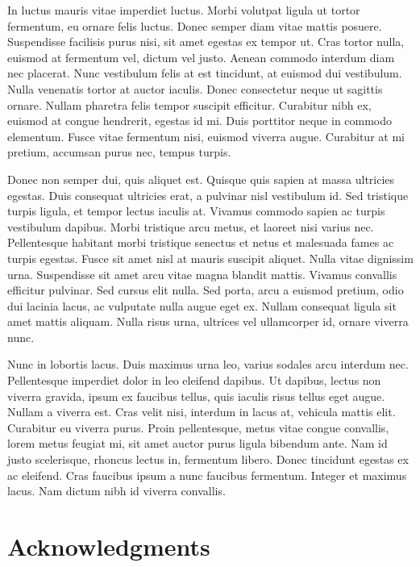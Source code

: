 \documentclass[
]{agujournal2019}
\begin{document}
In luctus mauris vitae imperdiet luctus. Morbi volutpat ligula ut tortor
fermentum, eu ornare felis luctus. Donec semper diam vitae mattis
posuere. Suspendisse facilisis purus nisi, sit amet egestas ex tempor
ut. Cras tortor nulla, euismod at fermentum vel, dictum vel justo.
Aenean commodo interdum diam nec placerat. Nunc vestibulum felis at est
tincidunt, at euismod dui vestibulum. Nulla venenatis tortor at auctor
iaculis. Donec consectetur neque ut sagittis ornare. Nullam pharetra
felis tempor suscipit efficitur. Curabitur nibh ex, euismod at congue
hendrerit, egestas id mi. Duis porttitor neque in commodo elementum.
Fusce vitae fermentum nisi, euismod viverra augue. Curabitur at mi
pretium, accumsan purus nec, tempus turpis.

Donec non semper dui, quis aliquet est. Quisque quis sapien at massa
ultricies egestas. Duis consequat ultricies erat, a pulvinar nisl
vestibulum id. Sed tristique turpis ligula, et tempor lectus iaculis at.
Vivamus commodo sapien ac turpis vestibulum dapibus. Morbi tristique
arcu metus, et laoreet nisi varius nec. Pellentesque habitant morbi
tristique senectus et netus et malesuada fames ac turpis egestas. Fusce
sit amet nisl at mauris suscipit aliquet. Nulla vitae dignissim urna.
Suspendisse sit amet arcu vitae magna blandit mattis. Vivamus convallis
efficitur pulvinar. Sed cursus elit nulla. Sed porta, arcu a euismod
pretium, odio dui lacinia lacus, ac vulputate nulla augue eget ex.
Nullam consequat ligula sit amet mattis aliquam. Nulla risus urna,
ultrices vel ullamcorper id, ornare viverra nunc.

Nunc in lobortis lacus. Duis maximus urna leo, varius sodales arcu
interdum nec. Pellentesque imperdiet dolor in leo eleifend dapibus. Ut
dapibus, lectus non viverra gravida, ipsum ex faucibus tellus, quis
iaculis risus tellus eget augue. Nullam a viverra est. Cras velit nisi,
interdum in lacus at, vehicula mattis elit. Curabitur eu viverra purus.
Proin pellentesque, metus vitae congue convallis, lorem metus feugiat
mi, sit amet auctor purus ligula bibendum ante. Nam id justo
scelerisque, rhoncus lectus in, fermentum libero. Donec tincidunt
egestas ex ac eleifend. Cras faucibus ipsum a nunc faucibus fermentum.
Integer et maximus lacus. Nam dictum nibh id viverra convallis.

\section{Acknowledgments}\label{acknowledgments}
\end{document}
